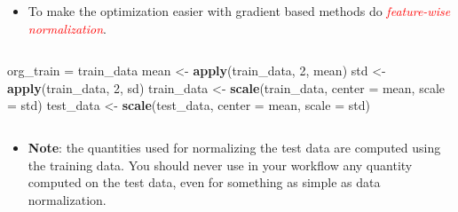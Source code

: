 \documentclass[10pt,ignorenonframetext,]{beamer}
\newenvironment{Shaded}{\begin{snugshade}}{\end{snugshade}}
\newcommand{\DataTypeTok}[1]{\textcolor[rgb]{0.13,0.29,0.53}{#1}}
\newcommand{\DecValTok}[1]{\textcolor[rgb]{0.00,0.00,0.81}{#1}}
\newcommand{\KeywordTok}[1]{\textcolor[rgb]{0.13,0.29,0.53}{\textbf{#1}}}
\newcommand{\NormalTok}[1]{#1}
\newcommand{\StringTok}[1]{\textcolor[rgb]{0.31,0.60,0.02}{#1}}
\providecommand{\tightlist}{%
  \setlength{\itemsep}{0pt}\setlength{\parskip}{0pt}}
\begin{document}
\begin{frame}[fragile]

\begin{itemize}
\tightlist
\item
  To make the optimization easier with gradient based methods do
  \emph{\textcolor{red}{feature-wise normalization}}.
\end{itemize}

\(~\)

\scriptsize

\begin{Shaded}
\begin{Highlighting}[]
\NormalTok{org_train =}\StringTok{ }\NormalTok{train_data}
\NormalTok{mean <-}\StringTok{ }\KeywordTok{apply}\NormalTok{(train_data, }\DecValTok{2}\NormalTok{, mean)}
\NormalTok{std <-}\StringTok{ }\KeywordTok{apply}\NormalTok{(train_data, }\DecValTok{2}\NormalTok{, sd)}
\NormalTok{train_data <-}\StringTok{ }\KeywordTok{scale}\NormalTok{(train_data, }\DataTypeTok{center =}\NormalTok{ mean, }\DataTypeTok{scale =}\NormalTok{ std)}
\NormalTok{test_data <-}\StringTok{ }\KeywordTok{scale}\NormalTok{(test_data, }\DataTypeTok{center =}\NormalTok{ mean, }\DataTypeTok{scale =}\NormalTok{ std)}
\end{Highlighting}
\end{Shaded}

\(~\)

\normalsize

\begin{itemize}
\tightlist
\item
  \textbf{Note}: the quantities used for normalizing the test data are
  computed using the training data. You should never use in your
  workflow any quantity computed on the test data, even for something as
  simple as data normalization.
\end{itemize}

\end{frame}
\end{document}
